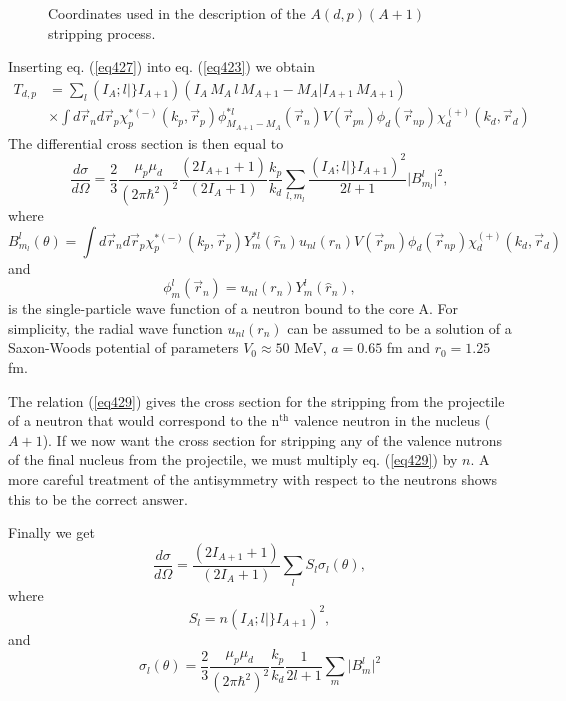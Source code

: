 \begin{subappendices}
\begin{figure}
\caption{Coordinates used in the description of the $A (d,p)(A+1)$ stripping process.}\label{fig6_E1}
\end{figure}

Inserting eq. (\ref{eq427}) into eq. (\ref{eq423}) we obtain
 \begin{equation}\label{eq428}
 \begin{split}
T_{d,p}&= \sum_l (I_A;l \vert \} I_{A+1}) (I_A\, M_A\, l\, M_{A+1}-M_A \vert I_{A+1}\,M_{A+1})  \\
&\times\int d\vec{r}_n d \vec{r}_p \chi^{* (-)}_p(k_p,\vec{r}_p) \phi_{M_{A+1}-M_A}^{*l}(\vec{r}_n)
V(\vec r_{pn}) \phi_d(\vec r_{np})
\chi^{(+)}_d(k_d,\vec{r}_d)
\end{split}
\end{equation}
The differential cross section is then equal to
\begin{equation}\label{eq429}
\frac{d \sigma}{d \Omega} = \frac{2}{3} \frac{\mu_p \mu_d}{(2\pi \hbar^2)^2}\frac{(2I_{A+1}+1)}{(2I_A+1)}
\frac{k_p}{k_d}\sum_{l,m_l}\frac{(I_A;l \vert \} I_{A+1})^2}{2l+1} \vert B_{m_l}^l\vert ^2,
\end{equation}
where
\begin{equation}\label{eq430}
B_{m_l}^l(\theta)=\int d\vec{r}_n d \vec{r}_p \chi^{* (-)}_p(k_p,\vec{r}_p) Y_m^{*l}(\hat r_n) u_{nl}(r_n)
V(\vec r_{pn}) \phi_d(\vec r_{np})
\chi^{(+)}_d(k_d,\vec{r}_d)
\end{equation}
and
\begin{equation}\label{eqC6E10}
\phi_m^{l}(\vec{r}_n)=u_{nl}(r_n) Y_m^{l}(\hat r_n),
\end{equation}
is the single-particle wave function of a neutron bound to  the core A. For simplicity, the radial wave function $u_{nl}(r_n)$ can be assumed to be a solution of a Saxon-Woods potential of parameters $V_0\approx 50$ MeV, $a=0.65$ fm and $r_0=1.25$ fm.



The relation (\ref{eq429}) gives the cross section for the stripping from the projectile of a neutron that would correspond to the n$^{\mathrm{th}}$ valence neutron in the nucleus ($A+1$). If we now want the cross section for stripping any of the valence nutrons of the final nucleus from the projectile, we must multiply eq. (\ref{eq429}) by $n$. A more careful treatment of the antisymmetry with respect to the neutrons shows this to be the correct answer.


Finally we get
\begin{equation}\label{eq432}
\frac{d \sigma}{d \Omega}=\frac{(2I_{A+1}+1)}{(2I_A+1)} \sum_l S_l \sigma_l(\theta),
\end{equation}
where
\begin{equation}\label{eq433}
S_l= n (I_A;l \vert \} I_{A+1})^2,
\end{equation}
and
\begin{equation}\label{eq434}
\sigma_l(\theta)=\frac{2}{3} \frac{\mu_p \mu_d}{(2\pi \hbar^2)^2}
\frac{k_p}{k_d}\frac{1}{2l+1}\sum_{m} \vert B_{m}^l\vert^2
\end{equation}



\end{subappendices}

